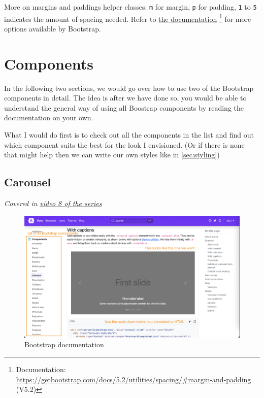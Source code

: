 More on margins and paddings helper classes: 
\texttt{m} for margin, \texttt{p} for padding, \texttt{1} to \texttt{5} indicates the amount of spacing needed. Refer to 
\href{https://getbootstrap.com/docs/5.2/utilities/spacing/#margin-and-padding}{the documentation}
\footnote{Documentation: \url{https://getbootstrap.com/docs/5.2/utilities/spacing/\#margin-and-padding}  (V5.2)} for more options available by Bootstrap.


\section{Components}
\label{sec:components}

In the following two sections, we would go over how to use two of the Bootstrap components in detail. The idea is after we have done so, you would be able to understand the general way of using all Boostrap components by reading the documentation on your own.

What I would do first is to check out all the components in the list and find out which component suits the best for the look I envisioned. (Or if there is none that might help then we can write our own styles like in \cref{sec:styling})

\subsection{Carousel}
\label{sec:carousels}

\textit{Covered in \href{https://www.youtube.com/watch?v=kNHgf6cjdBQ&list=PLjGmdnqrOKuYXiu7lgG5HW71jPEUd1XCm&index=10}{video 8 of the series}}
\vspace{6mm}

\begin{figure}[h]
\centering
\includegraphics[width=15cm]{images/chn7-carousel-docs.png}
\caption{Bootstrap documentation}
\end{figure}

